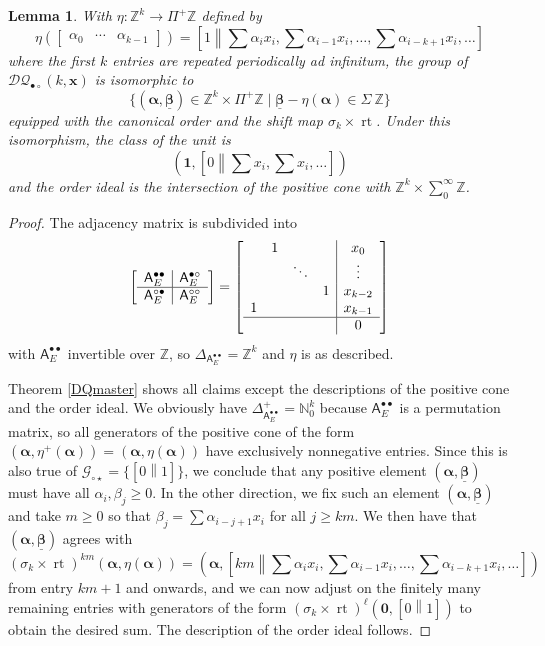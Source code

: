 \documentclass[12pt]{amsbook}%
\newcommand{\rt}{\operatorname{rt}}
\newtheorem{lemma}[theor]{Lemma}
\theoremstyle{defin}
\theoremstyle{remark}
\numberwithin{equation}{chapter}
\numberwithin{theor}{section}
\newcommand{\NN}{\mathbb{N}}
\newcommand{\ZZ}{\mathbb{Z}}
\newcommand{\singgen}{\mathcal G_{\circ\star}}
\newcommand{\DQ}{\mathcal{DQ}}
\newcommand{\RSi}{{\bullet\circ}}
\newcommand{\nsX}{\Sigma\ }
\newcommand{\osX}{\Pi^+}
\newcommand{\oXe}[2]{\left[#1\left\|{#2}\right.\right]}
\newcommand{\xx}{\mathbf{x}}
\newcommand{\uu}{\mathbf{1}}
\newcommand{\oo}{{\mathbf 0}}
\newcommand{\alal}{\pmb{\alpha}}
\newcommand{\bebebe}{\underline{\pmb{\beta}}}
\newcommand{\adjRR}{\mathsf{A}^{\bullet\bullet}}
\newcommand{\adjRS}{\mathsf{A}^{\bullet\circ}}
\newcommand{\adjSR}{\mathsf{A}^{\circ\bullet }}
\newcommand{\adjSS}{\mathsf{A}^{\circ\circ}}
\begin{document}
\begin{lemma}\label{RSkstable}
With $\eta:\ZZ^k\to \osX\ZZ$ defined by 
\[
\eta(\begin{bmatrix}\alpha_0&\cdots&\alpha_{k-1}\end{bmatrix})=\oXe{1}{\textstyle \sum \alpha_ix_i,\sum \alpha_{i-1}x_i,\dots,\sum \alpha_{i-k+1}x_i,\dots}
\]
where the first $k$ entries are repeated periodically \emph{ad infinitum}, 
the  group of $\DQ_{\RSi}(k,\xx)$  is isomorphic to
\[
\{(\alal,\bebebe)\in\ZZ^k\times \osX\ZZ\mid \bebebe-\eta(\alal)\in\nsX\ZZ\}
\]
equipped with the canonical order and the shift map $\sigma_k\times\rt$. Under this isomorphism, the class of the unit is
\[
(\uu,\oXe{0}{\textstyle \sum x_i, \sum x_i,\dots})
\]
and the order ideal is the intersection of the  positive cone with $\ZZ^k\times \sum_0^\infty \ZZ$.
\end{lemma}
\begin{proof}
The adjacency matrix is subdivided into 
\[
\left[\begin{array}{c|c}\adjRR_E&\adjRS_E\\\hline\adjSR_E&\adjSS_E\end{array}\right]=\left[\begin{array}{cccc|c}
&1&&&x_0\\
&&\ddots&&\vdots\\
&&&1&x_{k-2}\\
1&&&&x_{k-1}\\\hline&&&&0
\end{array}\right]
\]
with $\adjRR_E$ invertible over $\ZZ$, so $\Delta_{\adjRR_E}=\ZZ^k$ and $\eta$ is as described.

Theorem \ref{DQmaster} shows all claims except the descriptions of the positive cone and the order ideal. We obviously have $\Delta_{\adjRR_E}^+=\NN_0^k$ because $\adjRR_E$ is a permutation matrix, so all generators of the positive cone of the form $(\alal,\eta^+(\alal))=(\alal,\eta(\alal))$ have exclusively nonnegative entries. Since this is also true of $\singgen=\{\oXe{0}{1}\}$, we conclude that any positive element $(\alal,\bebebe)$ must have all $\alpha_i,\beta_j\geq 0$. In the other direction, we fix such an element $(\alal,\bebebe)$ and take $m\geq 0$ so that $\beta_j=\sum \alpha_{i-j+1}x_i$ for all $j\geq km$. We then have that $(\alal,\bebebe)$ agrees with
\[
(\sigma_k\times\rt)^{km}(\alal,\eta(\alal))=\left(\alal,\oXe{km}{\textstyle \sum \alpha_ix_i,\sum \alpha_{i-1}x_i,\dots,\sum \alpha_{i-k+1}x_i,\dots}\right)
\]
from entry $km+1$ and onwards, and we can now adjust on the  finitely many remaining entries with generators of the form $(\sigma_k\times\rt)^{\ell}(\oo,\oXe{ 0}{1})$ to obtain the desired sum.
The description of the order ideal follows.
\end{proof}
\end{document}
